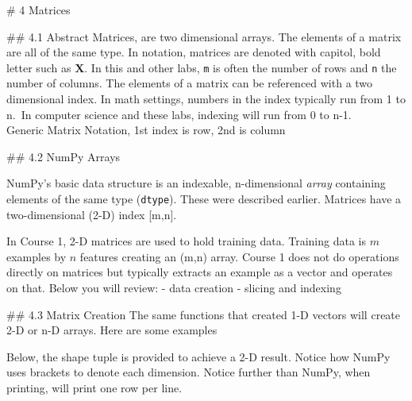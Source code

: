 \documentclass[11pt]{article}
\begin{document}
    \# 4 Matrices

    \#\# 4.1 Abstract Matrices, are two dimensional arrays. The elements of
a matrix are all of the same type. In notation, matrices are denoted
with capitol, bold letter such as \(\mathbf{X}\). In this and other
labs, \texttt{m} is often the number of rows and \texttt{n} the number
of columns. The elements of a matrix can be referenced with a two
dimensional index. In math settings, numbers in the index typically run
from 1 to n.~In computer science and these labs, indexing will run from
0 to n-1.\\

Generic Matrix Notation, 1st index is row, 2nd is column

    \#\# 4.2 NumPy Arrays

NumPy's basic data structure is an indexable, n-dimensional \emph{array}
containing elements of the same type (\texttt{dtype}). These were
described earlier. Matrices have a two-dimensional (2-D) index
{[}m,n{]}.

In Course 1, 2-D matrices are used to hold training data. Training data
is \(m\) examples by \(n\) features creating an (m,n) array. Course 1
does not do operations directly on matrices but typically extracts an
example as a vector and operates on that. Below you will review: - data
creation - slicing and indexing

    \#\# 4.3 Matrix Creation The same functions that created 1-D vectors
will create 2-D or n-D arrays. Here are some examples

    Below, the shape tuple is provided to achieve a 2-D result. Notice how
NumPy uses brackets to denote each dimension. Notice further than NumPy,
when printing, will print one row per line.
\end{document}
